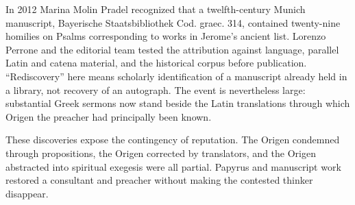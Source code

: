 In 2012 Marina Molin Pradel recognized that a twelfth-century Munich
manuscript, Bayerische Staatsbibliothek Cod. graec. 314, contained twenty-nine
homilies on Psalms corresponding to works in
Jerome's ancient list. Lorenzo Perrone and the editorial team tested the
attribution against language, parallel Latin and catena material, and the
historical corpus before publication. ``Rediscovery'' here means scholarly
identification of a manuscript already held in a library, not recovery of an
autograph. The event is nevertheless large: substantial Greek sermons now
stand beside the Latin translations through which Origen the preacher had
principally been known.

These discoveries expose the contingency of reputation. The Origen condemned
through propositions, the Origen corrected by translators, and the Origen
abstracted into spiritual exegesis were all partial. Papyrus and manuscript
work restored a consultant and preacher without making the contested thinker
disappear.
